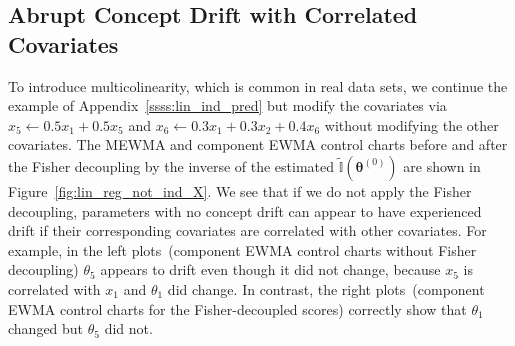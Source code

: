 \documentclass[twoside,11pt]{article}
\begin{document}
\begin{appendices}


\subsection{Abrupt Concept Drift with Correlated Covariates}
\label{ssss:lin_not_ind_pred}
To introduce multicolinearity, which is common in real data sets, we continue the example of Appendix~\ref{ssss:lin_ind_pred} but modify the covariates via $x_5 \leftarrow 0.5 x_1 + 0.5 x_5$ and $x_6 \leftarrow 0.3 x_1 + 0.3 x_2 + 0.4 x_6$ without modifying the other covariates. The MEWMA and component EWMA control charts before and after the Fisher decoupling by {the inverse of the estimated} $\widetilde{\mathbb {I}}(\bm { \theta}^{(0)})$ are shown in Figure~\ref{fig:lin_reg_not_ind_X}. We see that if we do not apply the Fisher decoupling, parameters with no concept drift can appear to have experienced drift if their corresponding covariates are correlated with other covariates. For example, in the left plots~(component EWMA control charts without Fisher decoupling) $\theta_5$ appears to drift even though it did not change, because $x_5$ is correlated with $x_1$ and $\theta_1$ did change. In contrast, the right plots~(component EWMA control charts for the Fisher-decoupled scores) correctly show that $\theta_1$ changed but $\theta_5$ did not.


\end{appendices}
\end{document}
